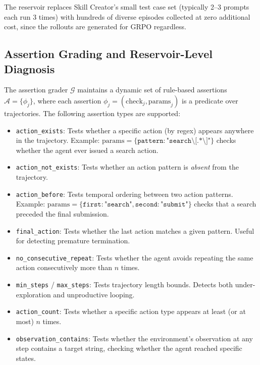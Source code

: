 \documentclass{article}
\theoremstyle{plain}
\theoremstyle{definition}
\theoremstyle{remark}
\begin{document}
The reservoir replaces Skill Creator's small test case set (typically 2--3 prompts each run 3 times) with hundreds of diverse episodes collected at zero additional cost, since the rollouts are generated for GRPO regardless.

\subsection{Assertion Grading and Reservoir-Level Diagnosis}

The assertion grader $\mathcal{G}$ maintains a dynamic set of rule-based assertions $\mathcal{A} = \{\phi_j\}$, where each assertion $\phi_j = (\text{check}_j, \text{params}_j)$ is a predicate over trajectories. The following assertion types are supported:

\begin{itemize}[itemsep=2pt, leftmargin=*]
    \item \texttt{action\_exists}: Tests whether a specific action (by regex) appears anywhere in the trajectory. Example: $\text{params} = \{\texttt{pattern}: \texttt{"search\textbackslash[.*\textbackslash]"}\}$ checks whether the agent ever issued a search action.
    \item \texttt{action\_not\_exists}: Tests whether an action pattern is \textit{absent} from the trajectory.
    \item \texttt{action\_before}: Tests temporal ordering between two action patterns. Example: $\text{params} = \{\texttt{first}: \texttt{"search"}, \texttt{second}: \texttt{"submit"}\}$ checks that a search preceded the final submission.
    \item \texttt{final\_action}: Tests whether the last action matches a given pattern. Useful for detecting premature termination.
    \item \texttt{no\_consecutive\_repeat}: Tests whether the agent avoids repeating the same action consecutively more than $n$ times.
    \item \texttt{min\_steps} / \texttt{max\_steps}: Tests trajectory length bounds. Detects both under-exploration and unproductive looping.
    \item \texttt{action\_count}: Tests whether a specific action type appears at least (or at most) $n$ times.
    \item \texttt{observation\_contains}: Tests whether the environment's observation at any step contains a target string, checking whether the agent reached specific states.
\end{itemize}
\end{document}
